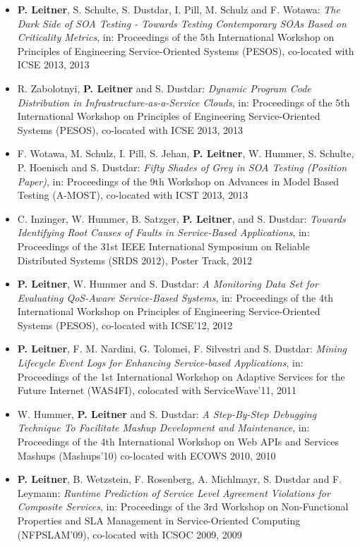 \documentclass[paper=letter,fontsize=11pt]{scrartcl} %
\begin{document}
\begin{itemize}
 \item \textbf{P. Leitner}, S. Schulte, S. Dustdar, I. Pill, M. Schulz and F. Wotawa: \emph{The Dark Side of SOA Testing - Towards Testing Contemporary SOAs Based on Criticality Metrics}, in: Proceedings of the 5th International Workshop on Principles of Engineering Service-Oriented Systems (PESOS), co-located with ICSE 2013, 2013
\item R. Zabolotnyi, \textbf{P. Leitner} and S. Dustdar: \emph{Dynamic Program Code Distribution in Infrastructure-as-a-Service Clouds}, in: Proceedings of the 5th International Workshop on Principles of Engineering Service-Oriented Systems (PESOS), co-located with ICSE 2013, 2013
\item F. Wotawa, M. Schulz, I. Pill, S. Jehan, \textbf{P. Leitner}, W. Hummer, S. Schulte, P. Hoenisch and S. Dustdar: \emph{Fifty Shades of Grey in SOA Testing (Position Paper)}, in: Proceedings of the 9th Workshop on Advances in Model Based Testing (A-MOST), co-located with ICST 2013, 2013
\item C. Inzinger, W. Hummer, B. Satzger, \textbf{P. Leitner}, and S. Dustdar:
\emph{Towards Identifying Root Causes of Faults in Service-Based Applications}, in: Proceedings of the 31st IEEE International Symposium on Reliable Distributed Systems (SRDS 2012), Poster Track, 2012
\item \textbf{P. Leitner}, W. Hummer and S. Dustdar:
\emph{A Monitoring Data Set for Evaluating QoS-Aware Service-Based Systems}, in: Proceedings of the 4th International Workshop on Principles of Engineering Service-Oriented Systems (PESOS), co-located with ICSE'12, 2012
\item \textbf{P. Leitner}, F. M. Nardini, G. Tolomei, F. Silvestri
and S. Dustdar: \emph{Mining Lifecycle Event Logs for Enhancing
Service-based Applications}, in: Proceedings of the 1st International Workshop on Adaptive Services
for the Future Internet (WAS4FI), colocated with ServiceWave'11, 2011
\item W. Hummer, \textbf{P. Leitner} and S. Dustdar: \emph{A Step-By-Step Debugging Technique To Facilitate Mashup Development and Maintenance}, in: Proceedings of the 4th International Workshop on Web APIs and Services Mashups (Mashups'10) co-located with ECOWS 2010, 2010
\item \textbf{P. Leitner}, B. Wetzstein, F. Rosenberg, A. Michlmayr, S. Dustdar and F. Leymann: \emph{Runtime Prediction of Service Level Agreement Violations for Composite Services}, in: Proceedings of the 3rd Workshop on Non-Functional Properties and SLA Management in Service-Oriented Computing (NFPSLAM'09), co-located with ICSOC 2009, 2009

\end{itemize}
\end{document}
